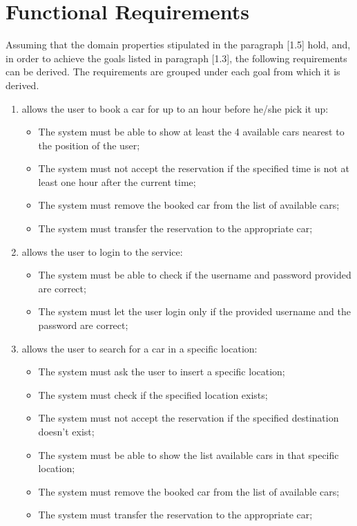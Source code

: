 \section{Functional Requirements}
Assuming that the domain properties stipulated in the paragraph [1.5] hold, and, in order to achieve the goals listed in paragraph [1.3], the following requirements can be derived. The requirements are grouped under each goal from which it is derived.

\begin{enumerate}

\item allows the user to book a car for up to an hour before he/she pick it up:

\begin{itemize}
\item The system must be able to show at least the 4 available cars nearest to the position of the user;
\item The system must not accept the reservation if the specified time is not at least one hour after the current time;
\item The system must remove the booked car from the list of available cars;
\item The system must transfer the reservation to the appropriate car;
\end{itemize}

\item allows the user to login to the service:

\begin{itemize}
\item The system must be able to check if the username and password provided are correct;
\item The system must let the user login only if the provided username and the password are correct;
\end{itemize}

\item allows the user to search for a car in a specific location:

\begin{itemize}
\item The system must ask the user to insert a specific location;
\item The system must check if the specified location exists;
\item The system must not accept the reservation if the specified destination doesn't exist;
\item The system must be able to show the list available cars in that specific location;
\item The system must remove the booked car from the list of available cars;
\item The system must transfer the reservation to the appropriate car;
\end{itemize}


\end{enumerate}
